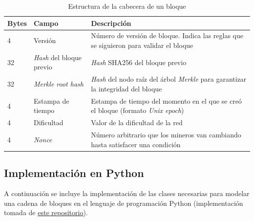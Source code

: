 \begin{table}[H]
    \begin{center}
        \begin{tabular}{ | l | l | p{9cm} | }
            \hline
            \textbf{Bytes} & \textbf{Campo} & \textbf{Descripción}  \\
            \hline
            4 & Versión & Número de versión de bloque. Indica las reglas que se siguieron para validar el bloque \\
            \hline
            32 & \emph{Hash} del bloque previo & \emph{Hash} SHA256 del bloque previo  \\
            \hline
            32 & \emph{Merkle root hash} & \emph{Hash} del nodo raíz del árbol \emph{Merkle} para garantizar la integridad del bloque \\
            \hline
            4 & Estampa de tiempo & Estampa de tiempo del momento en el que se creó el bloque (formato \emph{Unix epoch}) \\
            \hline
            4 & Dificultad & Valor de la dificultad de la red \\
            \hline
            4 & \emph{Nonce} & Número arbitrario que los mineros van cambiando hasta satisfacer una condición \\
            \hline
        \end{tabular}
        \caption*{Estructura de la cabecera de un bloque \autocite{MasteringBlockchainBlockHeaderStructure}}
    \end{center}
\end{table}


\subsection{Implementación en Python}

A continuación se incluye la implementación de las clases necesarias para modelar una cadena de bloques en el lenguaje de programación Python (implementación tomada de \underline{\href{https://github.com/howCodeORG/Simple-Python-Blockchain}{este repositorio}}).

